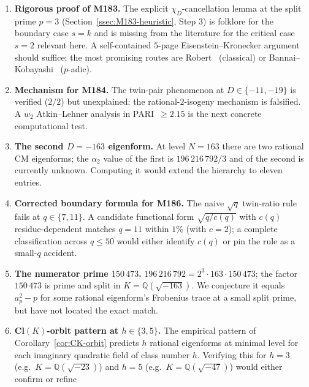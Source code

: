 \documentclass[12pt]{amsart}
\theoremstyle{definition}
\newcommand{\Q}{\mathbb{Q}}
\begin{document}
\begin{enumerate}[leftmargin=2em,label=\textbf{OP\arabic*.}]
  \item \textbf{Rigorous proof of M183.} The explicit
        $\chi_D$-cancellation lemma at the split prime $p = 3$
        (Section~\ref{ssec:M183-heuristic}, Step 3) is folklore for
        the boundary case $s = k$ and is missing from the literature
        for the critical case $s = 2$ relevant here. A self-contained
        $5$-page Eisenstein--Kronecker argument should suffice; the
        most promising routes are
        Robert~\cite{CITE-NEEDED-Robert1973} (classical) or
        Bannai--Kobayashi~\cite{CITE-NEEDED-BannaiKobayashi2011}
        ($p$-adic).
  \item \textbf{Mechanism for M184.} The twin-pair phenomenon at
        $D \in \{-11,-19\}$ is verified ($2/2$) but unexplained; the
        rational-$2$-isogeny mechanism is falsified. A $w_2$
        Atkin--Lehner analysis in PARI~$\geq 2.15$ is the next
        concrete computational test.
  \item \label{op:163-second}\textbf{The second $D = -163$ eigenform.}
        At level $N = 163$ there are two rational CM eigenforms; the
        $\alpha_2$ value of the first is $196\,216\,792/3$ and of the
        second is currently unknown. Computing it would extend the
        hierarchy to eleven entries.
  \item \textbf{Corrected boundary formula for M186.} The naive
        $\sqrt q$ twin-ratio rule fails at $q \in \{7, 11\}$. A
        candidate functional form $\sqrt{q/c(q)}$ with $c(q)$
        residue-dependent matches $q = 11$ within $1\%$ (with $c = 2$);
        a complete classification across $q \le 50$ would either
        identify $c(q)$ or pin the rule as a small-$q$ accident.
  \item \label{op:150473}\textbf{The numerator prime $150\,473$.}
        $196\,216\,792 = 2^3 \cdot 163 \cdot 150\,473$; the factor
        $150\,473$ is prime and split in $K = \Q(\sqrt{-163})$. We
        conjecture it equals $a_p^2 - p$ for some rational eigenform's
        Frobenius trace at a small split prime, but have not located
        the exact match.
  \item \textbf{Cl$(K)$-orbit pattern at $h \in \{3, 5\}$.} The
        empirical pattern of Corollary~\ref{cor:CK-orbit} predicts
        $h$ rational eigenforms at minimal level for each
        imaginary quadratic field of class number $h$. Verifying
        this for $h = 3$ (e.g.\ $K = \Q(\sqrt{-23})$) and $h = 5$
        (e.g.\ $K = \Q(\sqrt{-47})$) would either confirm or refine

\end{enumerate}
\end{document}
